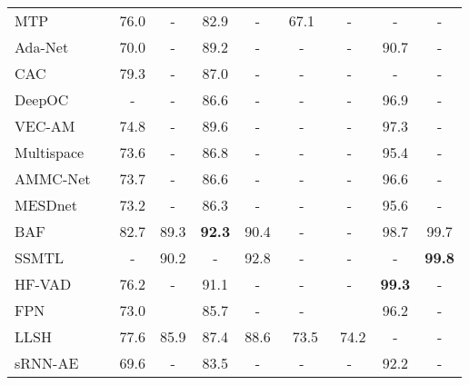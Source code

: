 \documentclass[lettersize,journal]{IEEEtran}
\begin{document}
\begin{table*}[!t]
\begin{tabular}{@{}lccccccccc@{}}
		MTP\cite{MultitimescaleTrajectory2020rodriguesa}	&    	& 76.0            	& -              	& 82.9		& -				& 67.1			& -            	& -			& -          \\
		Ada-Net\cite{LearningNormal2020song} 				&    	& 70.0            	& -              	& 89.2		& -				& -				& -            	& 90.7		& -          \\
		CAC\cite{ClusterAttention2020wanga}					&    	& 79.3            	& -              	& 87.0		& -				& -				& -            	& -			& -          \\
		DeepOC\cite{DeepOneClass2020wu} 					&    	& -            		& -              	& 86.6		& -				& -				& -            	& 96.9		& -          \\
		VEC-AM\cite{ClozeTest2020yu} 						& \cmk 	& 74.8       		& -          		& 89.6		& -				& -				& -      		& 97.3		& -    		\\
		Multispace\cite{NormalityLearning2021zhang}			&    	& 73.6            	& -              	& 86.8		& -				& -				& -            	& 95.4		& -          \\
		AMMC-Net\cite{AppearanceMotionMemory2021caia}		&    	& 73.7           	& -              	& 86.6		& -				& -				& -            	& 96.6		& -          \\
		MESDnet\cite{MultiEncoderEffective2021fang}			&    	& 73.2            	& -              	& 86.3		& -				& -				& -            	& 95.6		& -          \\
		BAF\cite{BackgroundAgnosticFramework2021georgescua} & \cmk 	& 82.7				& 89.3				& \textbf{92.3}	& 90.4		& -				& -      		& 98.7		& 99.7 \\
		SSMTL\cite{AnomalyDetection2021georgescua}			& \cmk 	& -          		& 90.2       		& -			& 92.8			& -				& -      		& -			& \textbf{99.8} \\
		HF\ts{2}-VAD\cite{HybridVideo2021liua}				& \cmk 	& 76.2       		& -          		& 91.1		& -				& -				& -      		& \textbf{99.3}& -      \\
		F\ts{2}PN\cite{FutureFrame2021luo}					&    	& 73.0            	&              		& 85.7		& -				& -				&             	& 96.2		& -          \\
		LLSH\cite{LearnableLocalitySensitive2021lu}			&    	& 77.6            	& 85.9              & 87.4		& 88.6			&~73.5\ts{\tddr}&~74.2\ts{\tddr}& -			& -          \\
		sRNN-AE\cite{VideoAnomaly2021luo}					&    	& 69.6            	& -              	& 83.5		& -				& -				& -            	& 92.2		& -          \\

\end{tabular}
\end{table*}
\end{document}
